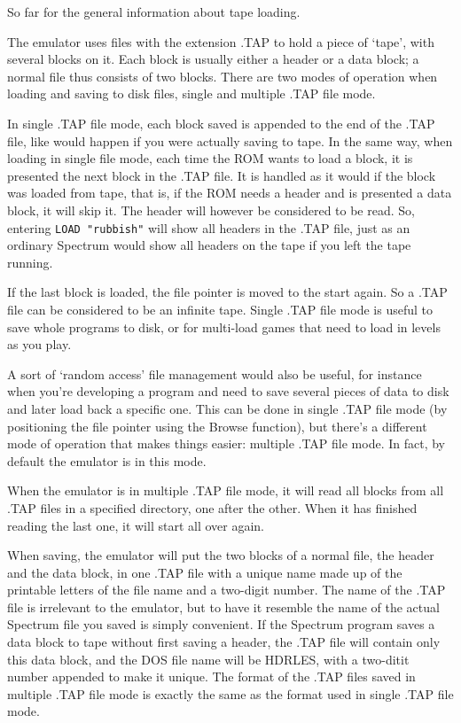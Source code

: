     So far for the general information about tape loading.

    The emulator uses files with the extension .TAP to hold a piece of
    `tape', with several blocks on it.  Each block is usually either a
    header or a data block; a normal file thus consists of two blocks. There
    are two modes of operation when loading and saving to disk files, single
    and multiple .TAP file mode.

    In single .TAP file mode, each block saved is appended to the end of the
    .TAP file, like would happen if you were actually saving to tape. In the
    same way, when loading in single file mode, each time the ROM wants to
    load a block, it is presented the next block in the .TAP file. It is
    handled as it would if the block was loaded from tape, that is, if the
    ROM needs a header and is presented a data block, it will skip it.  The
    header will however be considered to be read.  So, entering
    \verb|LOAD "rubbish"|
     will show all headers in the .TAP file, just as an ordinary
    Spectrum would show all headers on the tape if you left the tape
    running.

    If the last block is loaded, the file pointer is moved to the start
    again.  So a .TAP file can be considered to be an infinite tape. Single
    .TAP file mode is useful to save whole programs to disk, or for
    multi-load games that need to load in levels as you play.

    A sort of `random access' file management would also be useful, for
    instance when you're developing a program and need to save several
    pieces of data to disk and later load back a specific one.  This can be
    done in single .TAP file mode (by positioning the file pointer using the
    Browse function), but there's a different mode of operation that makes
    things easier: multiple .TAP file mode.  In fact, by default the
    emulator is in this mode.

    When the emulator is in multiple .TAP file mode, it will read all blocks
    from all .TAP files in a specified directory, one after the other.  When
    it has finished reading the last one, it will start all over again.

    When saving, the emulator will put the two blocks of a normal file, the
    header and the data block, in one .TAP file with a unique name made up
    of the printable letters of the file name and a two-digit number.  The
    name of the .TAP file is irrelevant to the emulator, but to have it
    resemble the name of the actual Spectrum file you saved is simply
    convenient.  If the Spectrum program saves a data block to tape without
    first saving a header, the .TAP file will contain only this data block,
    and the DOS file name will be HDRLES, with a two-ditit number appended
    to make it unique.  The format of the .TAP files saved in multiple .TAP
    file mode is exactly the same as the format used in single .TAP file
    mode.

